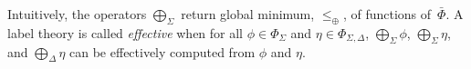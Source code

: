 \noindent 
Intuitively, the operators $\bigoplus_\Sigma$ 
return global minimum, \wrt $\leq_\oplus$, of functions of~$\bar\Phi$. 
%
A label theory is called \emph{effective} when 
for all $\phi \in \Phi_\Sigma$ and $\eta \in \Phi_{\Sigma, \Delta}$, 
$\bigoplus_{\Sigma} \phi$, 
$\bigoplus_{\Sigma} \eta$, and
$\bigoplus_{\Delta} \eta$
can be effectively computed from $\phi$ and $\eta$.
%

